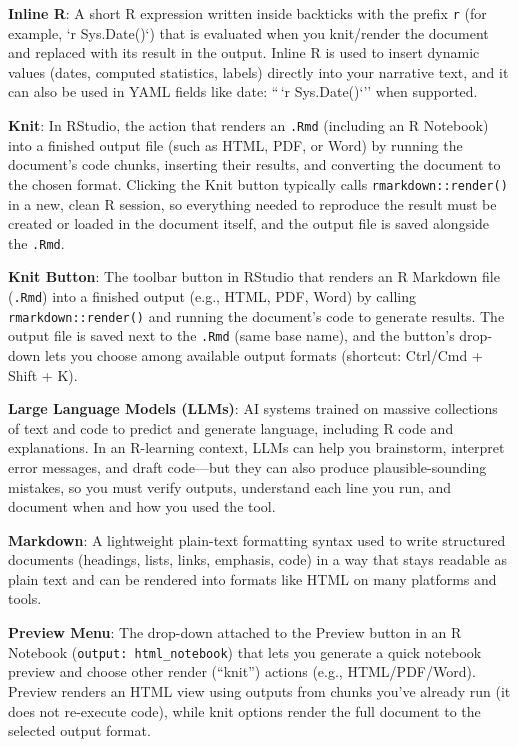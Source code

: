 \documentclass[
  12pt,
]{scrreprt}
\begin{document}
\textbf{Inline R}: A short R expression written inside backticks with
the prefix \texttt{r} (for example, `r Sys.Date()`) that is evaluated
when you knit/render the document and replaced with its result in the
output. Inline R is used to insert dynamic values (dates, computed
statistics, labels) directly into your narrative text, and it can also
be used in YAML fields like date: ``\,`r Sys.Date()`'' when supported.

\textbf{Knit}: In RStudio, the action that renders an \texttt{.Rmd}
(including an R Notebook) into a finished output file (such as HTML,
PDF, or Word) by running the document's code chunks, inserting their
results, and converting the document to the chosen format. Clicking the
Knit button typically calls \texttt{rmarkdown::render()} in a new, clean
R session, so everything needed to reproduce the result must be created
or loaded in the document itself, and the output file is saved alongside
the \texttt{.Rmd}.

\textbf{Knit Button}: The toolbar button in RStudio that renders an R
Markdown file (\texttt{.Rmd}) into a finished output (e.g., HTML, PDF,
Word) by calling \texttt{rmarkdown::render()} and running the document's
code to generate results. The output file is saved next to the
\texttt{.Rmd} (same base name), and the button's drop-down lets you
choose among available output formats (shortcut: Ctrl/Cmd + Shift + K).

\textbf{Large Language Models (LLMs)}: AI systems trained on massive
collections of text and code to predict and generate language, including
R code and explanations. In an R-learning context, LLMs can help you
brainstorm, interpret error messages, and draft code---but they can also
produce plausible-sounding mistakes, so you must verify outputs,
understand each line you run, and document when and how you used the
tool.

\textbf{Markdown}: A lightweight plain-text formatting syntax used to
write structured documents (headings, lists, links, emphasis, code) in a
way that stays readable as plain text and can be rendered into formats
like HTML on many platforms and tools.

\textbf{Preview Menu}: The drop-down attached to the Preview button in
an R Notebook (\texttt{output:\ html\_notebook}) that lets you generate
a quick notebook preview and choose other render (``knit'') actions
(e.g., HTML/PDF/Word). Preview renders an HTML view using outputs from
chunks you've already run (it does not re-execute code), while knit
options render the full document to the selected output format.
\end{document}
